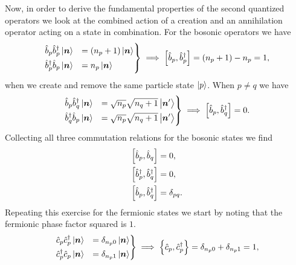             Now, in order to derive the fundamental properties of the second
            quantized operators we look at the combined action of a creation and
            an annihilation operator acting on a state in combination.
            For the bosonic operators we have
            \begin{align}
                \begin{drcases}
                    \ban{p}\bcr{p}\ket{\vfg{n}}
                    &= (n_p + 1)\ket{\vfg{n}}
                    \\
                    \bcr{p}\ban{p}\ket{\vfg{n}}
                    &= n_p \ket{\vfg{n}}
                \end{drcases}
                \implies
                \com{\ban{p}}{\bcr{p}}
                = (n_p + 1) - n_p = 1,
            \end{align}
            when we create and remove the same particle state $\ket{p}$.
            When $p \neq q$ we have
            \begin{align}
                \begin{drcases}
                    \ban{p}\bcr{q}\ket{\vfg{n}}
                    &= \sqrt{n_p}\sqrt{n_q + 1}\ket{\vfg{n}'}
                    \\
                    \bcr{q}\ban{p}\ket{\vfg{n}}
                    &= \sqrt{n_p}\sqrt{n_q + 1}\ket{\vfg{n}'}
                \end{drcases}
                \implies
                \com{\ban{p}}{\bcr{q}}
                = 0.
            \end{align}
            Collecting all three commutation relations for the bosonic states we
            find
            \begin{align}
                \left[\hat{b}_{p}, \hat{b}_{q}\right] &= 0, \\
                \left[\hat{b}_{p}^{\dagger}, \hat{b}_{q}^{\dagger}\right] &= 0, \\
                \left[\hat{b}_{p}, \hat{b}_{q}^{\dagger}\right] &= \delta_{pq}.
            \end{align}
            Repeating this exercise for the fermionic states we start by noting
            that the fermionic phase factor squared is $1$.
            \begin{align}
                \begin{drcases}
                    \can{p}\ccr{p}\ket{\vfg{n}}
                    &= \delta_{n_p0}\ket{\vfg{n}}
                    \\
                    \ccr{p}\can{p}\ket{\vfg{n}}
                    &= \delta_{n_p1}\ket{\vfg{n}}
                \end{drcases}
                \implies
                \acom{\can{p}}{\ccr{p}}
                = \delta_{n_p 0} + \delta_{n_p 1}
                = 1,
            \end{align}
